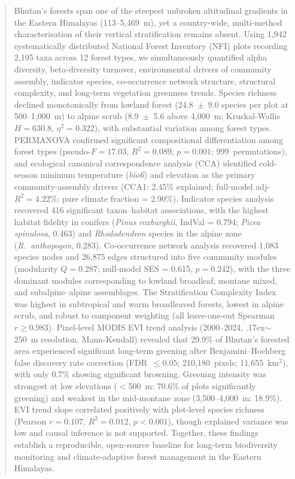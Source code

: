 \documentclass[review,12pt,a4paper]{elsarticle}
\begin{document}
\begin{frontmatter}
\begin{abstract}
Bhutan's forests span one of the steepest unbroken altitudinal gradients
in the Eastern Himalayas (113--5{,}469~m), yet a country-wide, multi-method
characterisation of their vertical stratification remains absent.
Using 1{,}942 systematically distributed National Forest Inventory (NFI)
plots recording 2{,}195 taxa across 12 forest types, we simultaneously
quantified alpha diversity, beta-diversity turnover, environmental
drivers of community assembly, indicator species, co-occurrence network
structure, structural complexity, and long-term vegetation greenness
trends. Species richness declined monotonically from lowland forest
(24.8~$\pm$~9.0 species per plot at 500--1{,}000~m) to alpine scrub
(8.9~$\pm$~5.6 above 4{,}000~m; Kruskal-Wallis $H = 630.8$,
$\eta^2 = 0.322$), with substantial variation among forest types.
PERMANOVA confirmed significant compositional differentiation among
forest types (pseudo-$F = 17.03$, $R^2 = 0.089$, $p = 0.001$;
999~permutations), and ecological canonical correspondence analysis
(CCA) identified cold-season minimum temperature (\textit{bio6}) and
elevation as the primary community-assembly drivers
(CCA1: 2.45\% explained; full-model adj-$R^2 = 4.22$\%;
pure climate fraction = 2.90\%).
Indicator species analysis recovered 416 significant taxon--habitat
associations, with the highest habitat fidelity in conifers
(\textit{Pinus roxburghii}, IndVal = 0.794;
\textit{Picea spinulosa}, 0.463) and \textit{Rhododendron} species in the
alpine zone (\textit{R.\ anthopogon}, 0.283).
Co-occurrence network analysis recovered 1{,}083 species nodes and
26{,}875 edges structured into five community modules
(modularity $Q = 0.287$; null-model SES = 0.615, $p = 0.242$),
with the three dominant modules corresponding to lowland broadleaf,
montane mixed, and subalpine--alpine assemblages.
The Stratification Complexity Index was highest in subtropical and warm
broadleaved forests, lowest in alpine scrub, and robust to component
weighting (all leave-one-out Spearman $r \geq 0.983$).
Pixel-level MODIS EVI trend analysis (2000--2024, {\raise.17ex\hbox{$\scriptstyle\sim$}}250~m resolution,
Mann-Kendall) revealed that 29.9\% of Bhutan's forested area experienced
significant long-term greening after Benjamini--Hochberg false discovery
rate correction (FDR~$\leq 0.05$; 210{,}180~pixels; 11{,}655~km$^2$),
with only 0.7\% showing significant browning.
Greening intensity was strongest at low elevations
($<$500~m: 70.6\% of plots significantly greening) and weakest in the
mid-montane zone (3{,}500--4{,}000~m: 18.9\%).
EVI trend slope correlated positively with plot-level species richness
(Pearson $r = 0.107$, $R^2 = 0.012$, $p < 0.001$), though explained
variance was low and causal inference is not supported.
Together, these findings establish a reproducible, open-source baseline
for long-term biodiversity monitoring and climate-adaptive forest
management in the Eastern Himalayas.
\end{abstract}


\end{frontmatter}
\end{document}
